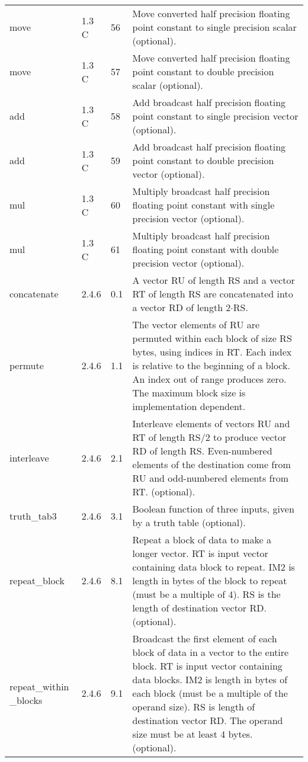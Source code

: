 \documentclass[forwardcom.tex]{subfiles}
\begin{document}
\begin{longtable} {|p{20mm}|p{10mm}|p{8mm}|p{75mm}|}
move          & 1.3 C & 56 & Move converted half precision floating point constant to single
precision scalar (optional). \\
move          & 1.3 C & 57 & Move converted half precision floating point constant to double
precision scalar (optional). \\
add           & 1.3 C & 58 & Add broadcast half precision floating point constant to single
precision vector (optional). \\
add           & 1.3 C & 59 & Add broadcast half precision floating point constant to double
precision vector (optional). \\
mul           & 1.3 C & 60 & Multiply broadcast half precision floating point constant with single precision vector (optional). \\
mul           & 1.3 C & 61 & Multiply broadcast half precision floating point constant with double precision vector (optional). \\

concatenate   & 2.4.6 & 0.1 & A vector RU of length RS and a vector RT of length RS are
concatenated into a vector RD of length 2$\cdot$RS. \\

permute       & 2.4.6 & 1.1 & The vector elements of RU are permuted within each block of size RS bytes, using indices in RT. Each index is relative to the
beginning of a block. An index out of range produces zero. The
maximum block size is implementation dependent. \\

interleave    & 2.4.6 & 2.1 & Interleave elements of vectors RU and RT of length RS/2 to produce vector RD of length RS. Even-numbered elements of the destination come from RU and odd-numbered elements from RT. (optional). \\

truth\_tab3   & 2.4.6 & 3.1 & Boolean function of three inputs, given by a truth table (optional). \\

repeat\_block  & 2.4.6 & 8.1 & Repeat a block of data to make a longer vector. RT is input vector containing data block to repeat. IM2 is length in bytes of the block to repeat (must be a multiple of 4). RS is the length of destination vector RD. (optional). \\

repeat\_within \_blocks & 2.4.6 & 9.1 & Broadcast the first element of each block of data in a vector to the entire block. RT is input vector containing data blocks. IM2 is length in bytes of each block (must be a multiple of the operand size). RS is length of destination vector RD. The operand size must be at least 4 bytes. (optional). \\


\end{longtable}
\end{document}
